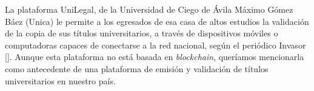 
%
%


La plataforma UniLegal, de la Universidad de Ciego de Ávila Máximo Gómez Báez (Unica) le permite a los egresados de esa casa de altos estudios la validación de la copia de sus títulos universitarios, a través de dispositivos móviles o computadoras capaces de conectarse a la red nacional, según el periódico Invasor [\cite{90}]. Aunque esta plataforma no está basada en \textit{blockchain}, queríamos mencionarla como antecedente de una plataforma de emisión y validación de títulos universitarios en nuestro país.

